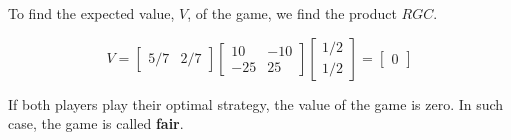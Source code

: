\begin{solution}
    To find the expected value, \( V \), of the game, we find the product \( RGC \).

    \[
        V = \begin{bmatrix} 5/7 & 2/7 \end{bmatrix}
        \begin{bmatrix}
            10  & -10 \\
            -25 & 25
        \end{bmatrix}
        \begin{bmatrix} 1/2 \\ 1/2 \end{bmatrix}
        = \begin{bmatrix} 0 \end{bmatrix}
    \]

    If both players play their optimal strategy, the value of the game is zero. In such case, the game is called \textbf{fair}.

\end{solution}
